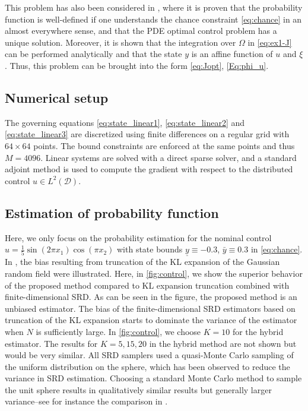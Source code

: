 \documentclass[%
onefignum,onetabnum]{siamonline250211}
\newcommand{\D}{{\mathcal D}}
\begin{document}
This problem has also been considered in \cite{HeStWe-SIAM25}, where it is proven that the probability function is well-defined if one understands the chance constraint \eqref{eq:chance} in an almost everywhere sense, and that the PDE optimal control problem has a unique solution. Moreover, it is shown that the integration over $\Omega$ in \eqref{eq:ex1-J} can be performed analytically and that the state $y$ is an affine function of $u$ and $\xi$. Thus, this problem can be brought into the form \eqref{eq:Jopt}, \eqref{Eq:phi_u}.

\subsection{Numerical setup}
The governing equations \eqref{eq:state_linear1}, \eqref{eq:state_linear2} and \eqref{eq:state_linear3} are discretized using finite differences on a regular grid with $64\times 64$ points. The bound constraints are enforced at the same points and thus $M=4096$. Linear systems are solved with a direct sparse solver, and a standard adjoint method is used to compute the gradient with respect to the distributed control $u\in L^2(\D)$.


\subsection{Estimation of probability function}
Here, we only focus on the probability estimation for the nominal control $u=\frac 15 \sin(2\pi x_1)\cos(\pi x_2)$ with state bounds $\underline y\equiv -0.3$, $\bar y\equiv 0.3$ in \eqref{eq:chance}.
In \cite{HeStWe-SIAM25}, the bias resulting from truncation of the KL expansion of the Gaussian random field were illustrated. Here, in \cref{fig:control}, we show the superior behavior of the proposed method compared to KL expansion truncation combined with finite-dimensional SRD. As can be seen in the figure, the proposed method is an unbiased estimator. The bias of the finite-dimensional SRD estimators based on truncation of the KL expansion starts to dominate the variance of the estimator when $N$ is sufficiently large. In \cref{fig:control}, we choose $K=10$ for the hybrid estimator. The results for $K=5,15,20$ in the hybrid method are not shown but would be very similar. All SRD samplers used a quasi-Monte Carlo sampling of the uniform distribution on the sphere, which has been observed to reduce the variance in SRD estimation. Choosing a standard Monte Carlo method to sample the unit sphere results in qualitatively similar results but generally larger variance--see for instance the comparison in \cite{HeStWe-SIAM25}.
\end{document}
